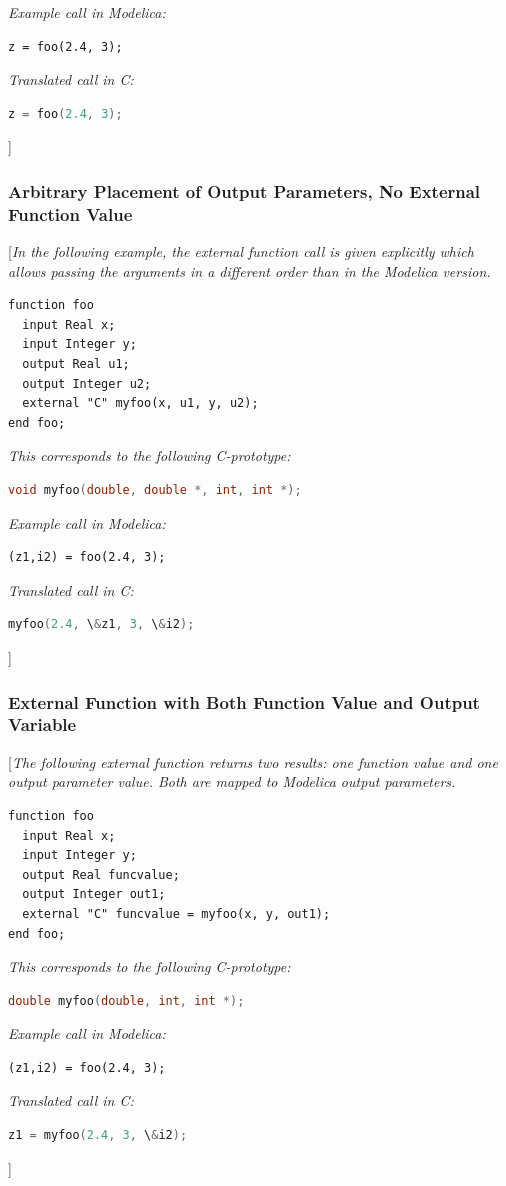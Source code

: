 \documentclass[10pt,a4paper]{report}
\def\doublelabel#1{\label{#1}}
\begin{document}
\emph{Example call in Modelica: }
\begin{lstlisting}[language=modelica]
z = foo(2.4, 3);
\end{lstlisting}
\emph{Translated call in C: }
\begin{lstlisting}[language=C]
z = foo(2.4, 3);
\end{lstlisting}
{]}

\subsubsection{Arbitrary Placement of Output Parameters, No External Function Value}\doublelabel{arbitrary-placement-of-output-parameters-no-external-function-value}

{[}\emph{In the following example, the external function call is given
explicitly which allows passing the arguments in a different order than
in the Modelica version.}

\begin{lstlisting}[language=modelica]
function foo
  input Real x;
  input Integer y;
  output Real u1;
  output Integer u2;
  external "C" myfoo(x, u1, y, u2);
end foo;
\end{lstlisting}
\emph{This corresponds to the following C-prototype:}
\begin{lstlisting}[language=C]
void myfoo(double, double *, int, int *);
\end{lstlisting}
\emph{Example call in Modelica: }
\begin{lstlisting}[language=modelica]
(z1,i2) = foo(2.4, 3);
\end{lstlisting}
\emph{Translated call in C: }
\begin{lstlisting}[language=C]
myfoo(2.4, \&z1, 3, \&i2);
\end{lstlisting}
{]}

\subsubsection{External Function with Both Function Value and Output Variable}\doublelabel{external-function-with-both-function-value-and-output-variable}

{[}\emph{The following external function returns two results: one
function value and one output parameter value. Both are mapped to
Modelica output parameters.}

\begin{lstlisting}[language=modelica]
function foo
  input Real x;
  input Integer y;
  output Real funcvalue;
  output Integer out1;
  external "C" funcvalue = myfoo(x, y, out1);
end foo;
\end{lstlisting}
\emph{This corresponds to the following C-prototype:}
\begin{lstlisting}[language=C]
double myfoo(double, int, int *);
\end{lstlisting}
\emph{Example call in Modelica: }
\begin{lstlisting}[language=modelica]
(z1,i2) = foo(2.4, 3);
\end{lstlisting}
\emph{Translated call in C:}
\begin{lstlisting}[language=C]
z1 = myfoo(2.4, 3, \&i2);
\end{lstlisting}
{]}
\end{document}
